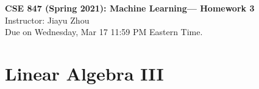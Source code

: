 \documentclass[11pt]{article}
\begin{document}
\thispagestyle {empty}

\newcommand{\lsp}[1]{\large\renewcommand{\baselinestretch}{#1}\normalsize}
\newcommand{\hsp}{\hspace{.2in}}
\newcommand{\comment}[1]{}
\newtheorem{thm}{Theorem}[section]
\newtheorem{lem}{Lemma}[section]
\newtheorem{cor}{Corollary}[section]
\newtheorem{prop}{Proposition}[section]
\newtheorem{problem}{Problem}[section]

\newcommand{\R}{{\rm\hbox{I\kern-.15em R}}}
\newcommand{\IR}{{\rm\hbox{I\kern-.15em R}}}
\newcommand{\IN}{{\rm\hbox{I\kern-.15em N}}}
\newcommand{\IZ}{{\sf\hbox{Z\kern-.40em Z}}}
\newcommand{\IS}{{\rm\hbox{S\kern-.45em S}}}
\newcommand{\Real}{I\!\!R}
\newcommand{\bw}{\mathbf{w}}
\newcommand{\bx}{\mathbf{x}}
\newcommand{\by}{\mathbf{y}}
\newcommand{\bm}{\mathbf{m}}
\newcommand{\bB}{\mathbf{B}}
\newcommand{\bW}{\mathbf{W}}
\newcommand{\bH}{\mathbf{H}}
\newcommand{\bR}{\mathbf{R}}

\newcommand{\linesep}{\vspace{.2cm}\hrule\vspace{0.2cm}}
\newcommand{\categorysep}{\vspace{0.5cm}}
\newcommand{\entrysep}{\vspace{0cm}}

\newcommand{\category}[1]{\categorysep
                  \noindent {\bf \large #1}
              \linesep}

\pagestyle{empty}

\begin{center}
{\large \textbf{CSE 847 (Spring 2021): Machine Learning--- Homework 3}} \\
 Instructor: Jiayu Zhou \\
 Due on Wednesday, Mar 17 11:59 PM Eastern Time. 
\end{center}

\section{Linear Algebra III}
\end{document}
